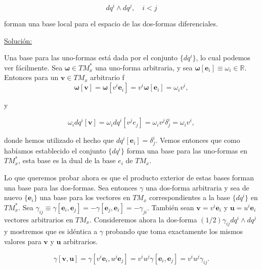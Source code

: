 \documentclass[a4paper,10pt]{article}
\numberwithin{equation}{section}
\begin{document}
$$
dq^i \wedge dq^j, \quad i < j
$$

forman una base local para el espacio de las dos-formas diferenciales.

\vspace{.3cm}

\underline{Solución:} \vspace{.3cm}

Una base para las uno-formas está dada por el conjunto $\{dq^i\}$, lo cual podemos 
ver fácilmente. Sea $\mathbf{\omega} \in TM_x^*$ una uno-forma arbitraria, y sea 
$\mathbf{\omega}[\mathbf{e}_i] \equiv \omega_i \in \mathbb{R}$. Entonces para un $\mathbf{v} \in 
TM_x$ arbitrario 
f
\begin{equation}
 \mathbf{\omega}[\mathbf{v}] = \mathbf{\omega}[v^i\mathbf{e}_i] =
 v^i\mathbf{\omega}[\mathbf{e}_i] = \omega_iv^i,
\end{equation}

y

\begin{equation}
 \omega_i dq^i[\mathbf{v}] = \omega_i dq^i[v^j e_j] = \omega_i v^j \delta^i_j = \omega_i v^i,
\end{equation}

donde hemos utilizado el hecho que $dq^i[\mathbf{e}_i] = \delta^i_j$. Vemos entonces que 
como habíamos establecido el conjunto $\{dq^i\}$ forma una base para las uno-formas 
en $TM_x^*$, esta base es la dual de la base $e_i$ de $TM_x$. 

\vspace{.3cm}

Lo que queremos probar ahora es que el producto exterior de estas bases forman una 
base para las dos-formas. Sea entonces $\gamma$ una dos-forma arbitraria y sea de nuevo 
$\{\mathbf{e}_i\}$ una base para los vectores en $TM_x$ correspondientes a la base 
$\{dq^i \}$ en $TM_x^*$. Sea $\gamma_{ij} \equiv \gamma[\mathbf{e}_i,\mathbf{e}_j] = 
- \gamma[\mathbf{e}_j,\mathbf{e}_i] = - \gamma_{ji}$. También sean $\mathbf{v} = v^i\mathbf{e}_i$ 
y $\mathbf{u} = u^i\mathbf{e}_i$ vectores arbitrarios en $TM_x$. Consideremos ahora la 
dos-forma $(1/2)\gamma_{ij}dq^i \wedge dq^j$ y mostremos que es idéntica a $\gamma$ 
probando que toma exactamente los mismos valores para $\mathbf{v}$ y $\mathbf{u}$ arbitrarios.

\begin{equation}
 \gamma[\mathbf{v},\mathbf{u}] = \gamma[v^i\mathbf{e}_i,u^j\mathbf{e}_j] = 
 v^iu^j\gamma[\mathbf{e}_i,\mathbf{e}_j] = v^iu^j\gamma_{ij}.
\end{equation}
\end{document}
